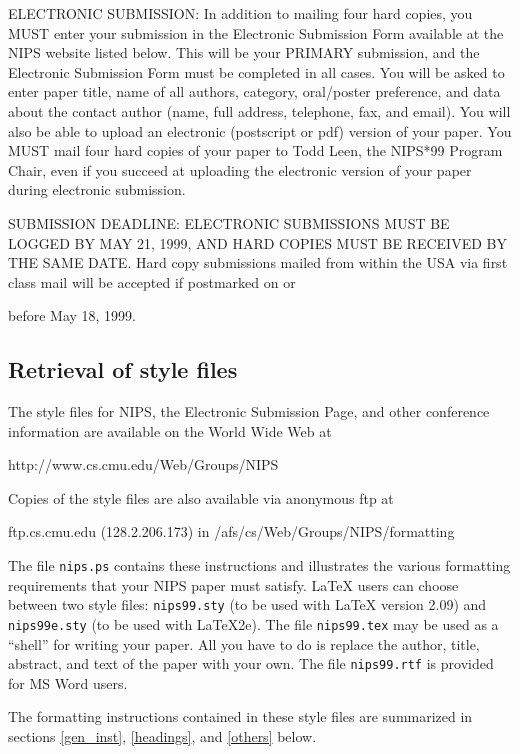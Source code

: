 ELECTRONIC SUBMISSION: In addition to mailing four hard copies, you MUST enter
your submission in the Electronic Submission Form available at the NIPS
website listed below. This will be your PRIMARY submission, and the Electronic
Submission Form must be completed in all cases. You will be asked to enter
paper title, name of all authors, category, oral/poster preference, and data
about the contact author (name, full address, telephone, fax, and email). You
will also be able to upload an electronic (postscript or pdf) version of your
paper. You MUST mail four hard copies of your paper to Todd Leen, the NIPS*99
Program Chair, even if you succeed at uploading the electronic version of your
paper during electronic submission.

SUBMISSION DEADLINE: ELECTRONIC SUBMISSIONS MUST BE LOGGED BY MAY 21, 1999,
AND HARD COPIES MUST BE RECEIVED BY THE SAME DATE. Hard copy submissions mailed
from within the USA via first class mail will be accepted if postmarked on or

before May 18, 1999.

\subsection{Retrieval of style files}
The style files for NIPS, the Electronic Submission Page, and other
conference information are available on the World Wide Web at
\begin{center}
   http://www.cs.cmu.edu/Web/Groups/NIPS
\end{center}
Copies of the style files are also available via anonymous ftp at
\begin{center}
   ftp.cs.cmu.edu (128.2.206.173) in /afs/cs/Web/Groups/NIPS/formatting
\end{center}
The file \verb+nips.ps+ contains these instructions and illustrates 
the various formatting requirements that your NIPS paper must 
satisfy. \LaTeX{} users can choose between two style files: 
\verb+nips99.sty+ (to be used with \LaTeX{} version 2.09) and 
\verb+nips99e.sty+ (to be used with \LaTeX{}2e). The file 
\verb+nips99.tex+ may be used as a ``shell'' for writing 
your paper.  All you have to do is replace the author, title, abstract, 
and text of the paper with your own. 
The file \verb+nips99.rtf+ is provided for MS Word users. 

The formatting instructions contained in these style files are 
summarized in sections \ref{gen_inst}, \ref{headings}, and
\ref{others} below. 

